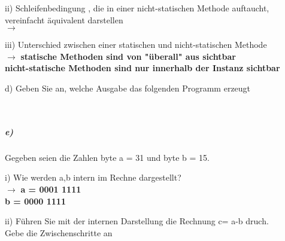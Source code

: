 \documentclass[paper=a4, fontsize=11pt]{scrartcl}
\numberwithin{equation}{section}
\numberwithin{figure}{section}
\numberwithin{table}{section}
\begin{document}
\begin{flushleft}
ii) Schleifenbedingung , die in einer nicht-statischen Methode auftaucht, vereinfacht äquivalent darstellen \\
$\rightarrow$   \\
\end{flushleft}

\begin{flushleft}
iii) Unterschied zwischen einer statischen und nicht-statischen Methode \\
$\rightarrow$ \textbf{statische Methoden sind von "überall" aus sichtbar} \\
\textbf{nicht-statische Methoden sind nur innerhalb der Instanz sichtbar}
\end{flushleft}

d) Geben Sie an, welche Ausgabe das folgenden Programm erzeugt \\

\begin{flushleft}
 \\
\end{flushleft}

\subparagraph{e)}
Gegeben seien die Zahlen byte a = 31 und byte b = 15.

\begin{flushleft}
i) Wie werden a,b intern im Rechne dargestellt? \\
$\rightarrow$ \textbf{a = 0001 1111}\\
\textbf{b = 0000 1111}
\end{flushleft}

\begin{flushleft}
ii) Führen Sie mit der internen Darstellung die Rechnung c= a-b druch. \\
Gebe die Zwischenschritte an\\
\end{flushleft}
\end{document}
